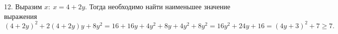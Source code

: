 12. Выразим $x:\ x=4+2y.$ Тогда необходимо найти наименьшее значение выражения $(4+2y)^2+2(4+2y)y+8y^2=16+16y+4y^2+8y+4y^2+8y^2=
16y^2+24y+16=(4y+3)^2+7\geqslant7.$\\
